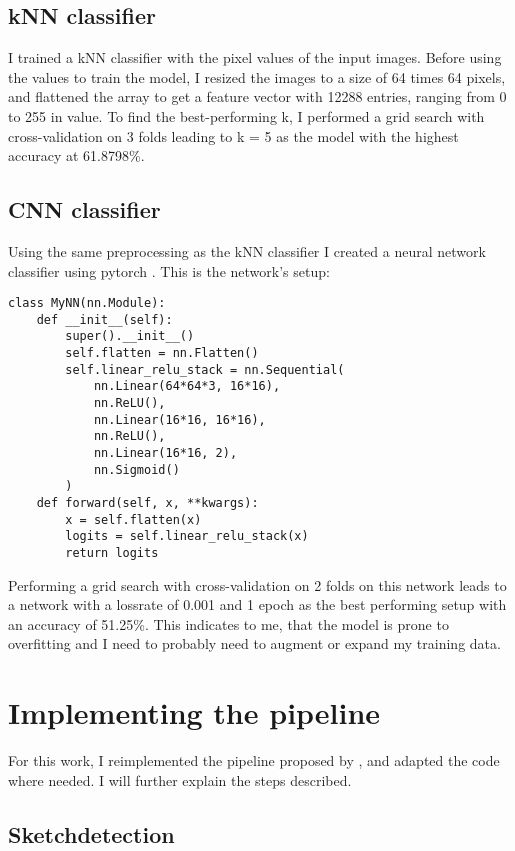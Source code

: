 \subsection*{kNN classifier}
I trained a kNN classifier with the pixel values of the input images. Before
using the values to train the model, I resized the images to a size of 64 times 
64 pixels, and flattened the array to get a feature vector with 12288 entries, 
ranging from 0 to 255 in value. To find the best-performing k, I performed a
grid search with cross-validation on 3 folds leading to k = 5 as the model with 
the highest accuracy at 61.8798\%.

\subsection*{CNN classifier}
Using the same preprocessing as the kNN classifier I created a neural network
classifier using pytorch \textcite{pytorch}. This is the network's setup:

\begin{lstlisting}
class MyNN(nn.Module):
    def __init__(self):
        super().__init__()
        self.flatten = nn.Flatten()
        self.linear_relu_stack = nn.Sequential(
            nn.Linear(64*64*3, 16*16),
            nn.ReLU(),
            nn.Linear(16*16, 16*16),
            nn.ReLU(),
            nn.Linear(16*16, 2),
            nn.Sigmoid()
        )
    def forward(self, x, **kwargs):
        x = self.flatten(x)
        logits = self.linear_relu_stack(x)
        return logits
\end{lstlisting}

Performing a grid search with cross-validation on 2 folds on this network leads
to a network with a lossrate of 0.001 and 1 epoch as the best performing setup
with an accuracy of 51.25\%. This indicates to me, that the model is prone to
overfitting and I need to probably need to augment or expand my training data.

\section*{Implementing the pipeline}
For this work, I reimplemented the pipeline proposed by
\textcite{korpitsch-2023-sao}, and adapted the code where needed. I will further
explain the steps described.

\subsection*{Sketchdetection}